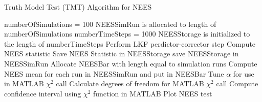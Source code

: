 \documentclass[paper=a4, fontsize=11pt]{scrartcl} %
\numberwithin{equation}{section} %
\numberwithin{figure}{section} %
\numberwithin{table}{section} %
\begin{document}
\begin{framed}
\begin{algorithm}[H]
\caption{Truth Model Test (TMT) Algorithm for NEES}\label{alg:TMT_nees_algo}
\begin{algorithmic}[1] %
\State numberOfSimulations = 100
\State NEESSimRun is allocated to length of numberOfSimulations
\State numberTimeSteps = 1000
\State NEESStorage is initialized to the length of numberTimeSteps
\State Perform LKF perdictor-corrector step
\State Compute NEES statistic
\State Save NEES Statistic in NEESStorage
\EndWhile
\State save NEESStorage in NEESSimRun
\EndWhile
\State Allocate NEESBar with length equal to simulation runs
\State Compute NEES mean for each run in NEESSimRun and put in NEESBar
\State Tune $\alpha$ for use in MATLAB $\chi^2$ call
\State Calculate degrees of freedom for MATLAB $\chi^2$ call 
\State Compute confidence interval using $\chi^2$  function in MATLAB
\State Plot NEES test
\end{algorithmic}
\end{algorithm}
\newpage

\end{framed}
\end{document}
